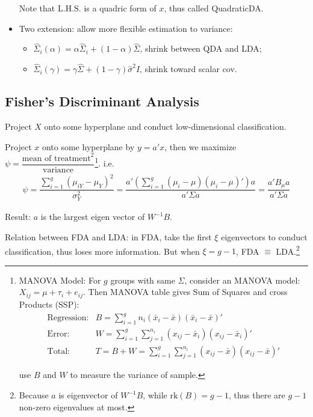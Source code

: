 \begin{itemize}[topsep=2pt,itemsep=2pt]
        Note that $  \mathrm{L.H.S.} $ is a quadric form of $ x $, thus called QuadraticDA.
        \item Two extension: allow more flexible estimation to variance:
        \begin{itemize}[topsep=2pt,itemsep=2pt]
            \item $ \hat{\Sigma }_i(\alpha )=\alpha\hat{\Sigma }_i+(1-\alpha )\hat{\Sigma } $, shrink between QDA and LDA;
            \item $ \hat{\Sigma }_i(\gamma )=\gamma \hat{\Sigma }+(1-\gamma )\hat{\sigma }^2I $, shrink toward scalar cov.
        \end{itemize}
        
            
    \end{itemize}
    

\subsection{Fisher's Discriminant Analysis}
    Project $ X $ onto some hyperplane and conduct low-dimensional classification.

    Project $ x $ onto some hyperplane by $ y=a'x  $, then we maximize $ \psi =\dfrac{\text{mean of treatment}^2}{\text{variance}} $\footnote{MANOVA Model:    
    For $ g $ groups with same $ \Sigma  $, consider an MANOVA model: $ X_{ij}=\mu +\tau_i+e_{ij} $. Then MANOVA table gives Sum of Squares and cross Products (SSP):
    \begin{align}
        \text{Regression:}&B=\sum_{i=1}^gn_i(\bar{x}_i-\bar{x})(\bar{x}_i-\bar{x})'\\
        \text{Error:}&W=\sum_{i=1}^g\sum_{j=1}^{n_i}(x_{ij}-\bar{x}_i)(x_{ij}-\bar{x}_i)'\\
        \text{Total:}&T=B+W=\sum_{i=1}^g\sum_{j=1}^{n_i}(x_{ij}-\bar{x})(x_{ij}-\bar{x})'
    \end{align}

    use $ B $ and $ W $ to measure the variance of sample.
    }. i.e.
    \begin{align}
        \psi =\dfrac{\sum\limits_{i=1}^g(\mu_{iY}-\mu_Y)^2}{\sigma ^2_Y}=\dfrac{a'\left(\sum\limits_{i=1}^g(\mu_i-\mu)(\mu_i-\mu)'\right)a}{a'\Sigma a}=\dfrac{a'B_\mu a}{a'\Sigma a}
    \end{align}
    
    Result: $ a $ is the largest eigen vector of $ W^{-1}B $.

    Relation between FDA and LDA: in FDA, take the first $ \xi  $ eigenvectors to conduct classification, thus loses more information. But when $ \xi =g-1 $, FDA $ \equiv $ LDA.\footnote{Because $ a $ is eigenvector of $ W^{-1}B $, while $ \mathrm{rk}(B)=g-1 $, thus there are $ g-1 $ non-zero eigenvalues at most.}
   
